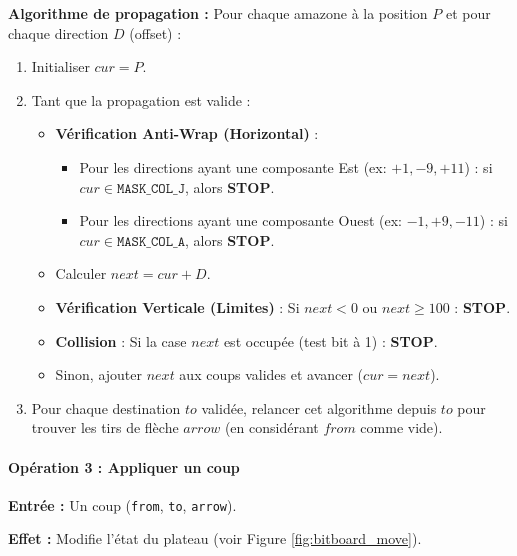 \documentclass[a4paper]{article}
\begin{document}
\textbf{Algorithme de propagation :}
Pour chaque amazone à la position $P$ et pour chaque direction $D$ (offset) :
\begin{enumerate}
    \item Initialiser $cur = P$.
    \item Tant que la propagation est valide :
    \begin{itemize}
        \item \textbf{Vérification Anti-Wrap (Horizontal)} :
        \begin{itemize}
            \item Pour les directions ayant une composante Est (ex: $+1, -9, +11$) : si $cur \in \texttt{MASK\_COL\_J}$, alors \textbf{STOP}.
            \item Pour les directions ayant une composante Ouest (ex: $-1, +9, -11$) : si $cur \in \texttt{MASK\_COL\_A}$, alors \textbf{STOP}.
        \end{itemize}
        \item Calculer $next = cur + D$.
        \item \textbf{Vérification Verticale (Limites)} : Si $next < 0$ ou $next \ge 100$ : \textbf{STOP}.
        \item \textbf{Collision} : Si la case $next$ est occupée (test bit à 1) : \textbf{STOP}.
        \item Sinon, ajouter $next$ aux coups valides et avancer ($cur = next$).
    \end{itemize}
    \item Pour chaque destination $to$ validée, relancer cet algorithme depuis $to$ pour trouver les tirs de flèche $arrow$ (en considérant $from$ comme vide).
\end{enumerate}

\paragraph{Opération 3 : Appliquer un coup}

\textbf{Entrée :} Un coup (\texttt{from}, \texttt{to}, \texttt{arrow}).

\textbf{Effet :} Modifie l'état du plateau (voir Figure \ref{fig:bitboard_move}).
\end{document}
